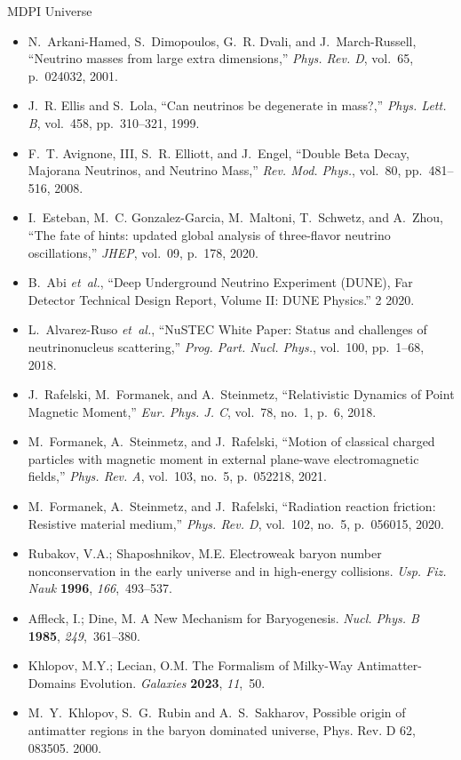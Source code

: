 \documentclass[a4paper, 10pt]{letter}
\begin{document}
\begin{letter}{MDPI Universe}
\begin{itemize}
    \item N.~Arkani-Hamed, S.~Dimopoulos, G.~R. Dvali, and J.~March-Russell, ``{Neutrino masses from large extra dimensions},'' {\em Phys. Rev. D}, vol.~65, p.~024032, 2001.    
    \item J.~R. Ellis and S.~Lola, ``{Can neutrinos be degenerate in mass?},'' {\em Phys. Lett. B}, vol.~458, pp.~310--321, 1999.
    \item F.~T. Avignone, III, S.~R. Elliott, and J.~Engel, ``{Double Beta Decay, Majorana Neutrinos, and Neutrino Mass},'' {\em Rev. Mod. Phys.}, vol.~80, pp.~481--516, 2008.
    \item I.~Esteban, M.~C. Gonzalez-Garcia, M.~Maltoni, T.~Schwetz, and A.~Zhou, ``{The fate of hints: updated global analysis of three-flavor neutrino oscillations},'' {\em JHEP}, vol.~09, p.~178, 2020.
    \item B.~Abi {\em et~al.}, ``{Deep Underground Neutrino Experiment (DUNE), Far Detector Technical Design Report, Volume II: DUNE Physics}.'' 2 2020.
    \item L.~Alvarez-Ruso {\em et~al.}, ``{NuSTEC White Paper: Status and challenges of neutrino\textendash{}nucleus scattering},'' {\em Prog. Part. Nucl. Phys.}, vol.~100, pp.~1--68, 2018.
    \item J.~Rafelski, M.~Formanek, and A.~Steinmetz, ``{Relativistic Dynamics of Point Magnetic Moment},'' {\em Eur. Phys. J. C}, vol.~78, no.~1, p.~6, 2018.
    \item M.~Formanek, A.~Steinmetz, and J.~Rafelski, ``{Motion of classical charged particles with magnetic moment in external plane-wave electromagnetic fields},'' {\em Phys. Rev. A}, vol.~103, no.~5, p.~052218, 2021.
    \item M.~Formanek, A.~Steinmetz, and J.~Rafelski, ``{Radiation reaction friction: Resistive material medium},'' {\em Phys. Rev. D}, vol.~102, no.~5, p.~056015, 2020.
    \item Rubakov, V.A.; Shaposhnikov, M.E. {Electroweak baryon number nonconservation in the early universe and  in high-energy collisions}. {\em Usp. Fiz. Nauk} {\bf 1996}, {\em 166},~493--537.
    \item Affleck, I.; Dine, M. {A New Mechanism for Baryogenesis}. {\em Nucl. Phys. B} {\bf 1985}, {\em 249},~361--380.
    \item Khlopov, M.Y.; Lecian, O.M. {The Formalism of Milky-Way Antimatter-Domains Evolution}. {\em Galaxies} {\bf 2023}, {\em 11},~50.
    \item M.~Y.~Khlopov, S.~G.~Rubin and A.~S.~Sakharov, {Possible origin of antimatter regions in the baryon dominated universe}, Phys. Rev. D 62, 083505. 2000.

\end{itemize}
\end{letter}
\end{document}
